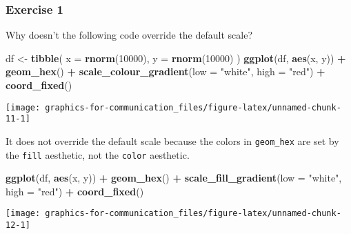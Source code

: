 \documentclass[]{book}
\newenvironment{Shaded}{\begin{snugshade}}{\end{snugshade}}
\newcommand{\DataTypeTok}[1]{\textcolor[rgb]{0.13,0.29,0.53}{#1}}
\newcommand{\DecValTok}[1]{\textcolor[rgb]{0.00,0.00,0.81}{#1}}
\newcommand{\KeywordTok}[1]{\textcolor[rgb]{0.13,0.29,0.53}{\textbf{#1}}}
\newcommand{\NormalTok}[1]{#1}
\newcommand{\OperatorTok}[1]{\textcolor[rgb]{0.81,0.36,0.00}{\textbf{#1}}}
\newcommand{\StringTok}[1]{\textcolor[rgb]{0.31,0.60,0.02}{#1}}
\theoremstyle{plain}
\theoremstyle{remark}
\theoremstyle{definition}
\theoremstyle{definition}
\theoremstyle{definition}
\theoremstyle{remark}
\begin{document}
\hypertarget{exercise-1-75}{%
\subsubsection{Exercise 1}\label{exercise-1-75}}

Why doesn't the following code override the default scale?

\begin{Shaded}
\begin{Highlighting}[]
\NormalTok{df <-}\StringTok{ }\KeywordTok{tibble}\NormalTok{(}
  \DataTypeTok{x =} \KeywordTok{rnorm}\NormalTok{(}\DecValTok{10000}\NormalTok{),}
  \DataTypeTok{y =} \KeywordTok{rnorm}\NormalTok{(}\DecValTok{10000}\NormalTok{)}
\NormalTok{)}
\KeywordTok{ggplot}\NormalTok{(df, }\KeywordTok{aes}\NormalTok{(x, y)) }\OperatorTok{+}
\StringTok{  }\KeywordTok{geom_hex}\NormalTok{() }\OperatorTok{+}
\StringTok{  }\KeywordTok{scale_colour_gradient}\NormalTok{(}\DataTypeTok{low =} \StringTok{"white"}\NormalTok{, }\DataTypeTok{high =} \StringTok{"red"}\NormalTok{) }\OperatorTok{+}
\StringTok{  }\KeywordTok{coord_fixed}\NormalTok{()}
\end{Highlighting}
\end{Shaded}

\begin{center}\texttt{[image: graphics-for-communication\_files/figure-latex/unnamed-chunk-11-1]} \end{center}

It does not override the default scale because the colors in
\texttt{geom\_hex} are set by the \texttt{fill} aesthetic, not the
\texttt{color} aesthetic.

\begin{Shaded}
\begin{Highlighting}[]
\KeywordTok{ggplot}\NormalTok{(df, }\KeywordTok{aes}\NormalTok{(x, y)) }\OperatorTok{+}
\StringTok{  }\KeywordTok{geom_hex}\NormalTok{() }\OperatorTok{+}
\StringTok{  }\KeywordTok{scale_fill_gradient}\NormalTok{(}\DataTypeTok{low =} \StringTok{"white"}\NormalTok{, }\DataTypeTok{high =} \StringTok{"red"}\NormalTok{) }\OperatorTok{+}
\StringTok{  }\KeywordTok{coord_fixed}\NormalTok{()}
\end{Highlighting}
\end{Shaded}

\begin{center}\texttt{[image: graphics-for-communication\_files/figure-latex/unnamed-chunk-12-1]} \end{center}
\end{document}
